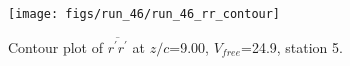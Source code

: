 \begin{figure}[H]
\centering
\texttt{[image: figs/run\_46/run\_46\_rr\_contour]}
\caption{Contour plot of $\overline{r^\prime r^\prime}$ at $z/c$=9.00, $V_{free}$=24.9, station 5.}
\label{fig:run_46_rr_contour}
\end{figure}


